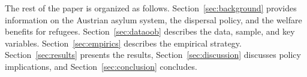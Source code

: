 %








The rest of the paper is organized as follows. Section~\ref{sec:background} provides information on the Austrian asylum system, the dispersal policy, and the welfare benefits for refugees. Section~\ref{sec:dataoob} describes the data, sample, and key variables. Section~\ref{sec:empirics} describes the empirical strategy. Section~\ref{sec:results} presents the results, Section~\ref{sec:discussion} discusses policy implications, and Section~\ref{sec:conclusion} concludes.%


